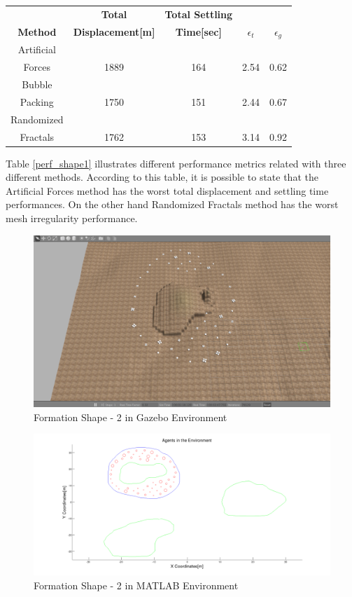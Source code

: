 \begin{center}
 \label{perf_shape1} 
\begin{tabular}{|c|c|c|c|c|}
					
\hline
\textbf{} & \textbf{Total}  & \textbf{Total Settling} & \textbf{} & \textbf{} \\ \textbf{Method} & \textbf{Displacement[m]} & \textbf{Time[sec]}& \textbf{$\epsilon_t$} & \textbf{$\epsilon_g$} \\
\hline
Artificial&  &  &  & \\
 Forces & 1889 & 164& 2.54 & 0.62\\
 \hline
 Bubble&  &  &  & \\
 Packing &1750 &151 &2.44 & 0.67\\
\hline
 Randomized&  &  &  & \\
 Fractals &1762 &153 &3.14 & 0.92\\
\hline
\end{tabular}
\end{center}
Table \ref{perf_shape1} illustrates different performance metrics related with three different methods. According to this table, it is possible to state that the Artificial Forces method has the worst total displacement and settling time performances. On the other hand Randomized Fractals method has the worst mesh irregularity performance.
\begin{figure}[H]
\caption{Formation Shape - 2 in Gazebo Environment}
\centerline{\includegraphics[scale = 0.32]{2_Gazebo}}
\end{figure} 
		 
\begin{figure}[H]
\caption{Formation Shape - 2 in MATLAB Environment}
\centerline{\includegraphics[scale = 0.32]{2}}
\end{figure} 
		 

